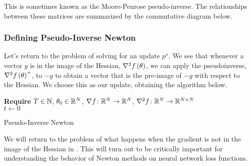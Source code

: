 \documentclass[../../thesis.tex]{subfiles}
\begin{document}
This is sometimes known as the Moore-Penrose pseudo-inverse.
The relationships between these matrices
are summarized by the commutative diagram below.
\begin{center}
\end{center}


\subsubsection{Defining Pseudo-Inverse Newton}

Let's return to the problem of solving
for an update $p^{\star}$.
We see that whenever a vector $g$
is in the image of the Hessian, $\nabla^2f\left(\theta\right)$,
we can apply the pseudoinverse, $\nabla^2f\left(\theta\right)^{+}$,
to $-g$ to obtain a vector that is the pre-image of $-g$
with respect to the Hessian.
We choose this as our update,
obtaining the algorithm below.
\\
\begin{algorithm}[H]
    \SetAlgoLined{}
    \textbf{Require}
    $T\in \mathbb{N}$, $\theta_0 \in \mathbb{R}^N$,
    $\nabla{f}\colon\mathbb{R}^N\to\mathbb{R}^N$,
    $\nabla^2{f}\colon\mathbb{R}^N\to\mathbb{R}^{N\times N}$\\
    $t \leftarrow 0$\\
    \caption{Pseudo-Inverse Newton}
\end{algorithm}

We will return to the problem of what happens
when the gradient is not in the image of the Hessian in .
This will turn out to be critically important for understanding
the behavior of Newton methods on neural network loss functions.
\end{document}
